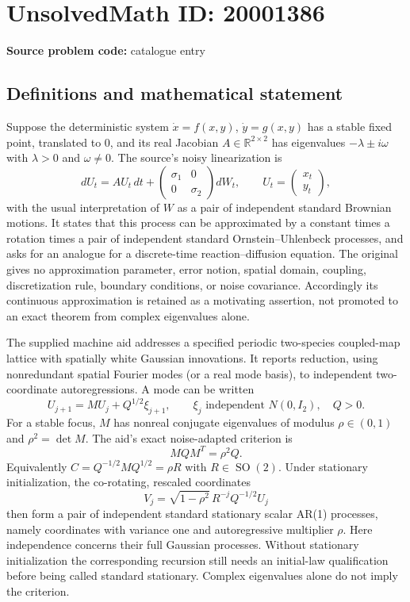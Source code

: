 \documentclass[11pt]{article}
\newcommand{\R}{\mathbb{R}}
\begin{document}
\section*{UnsolvedMath ID: 20001386}
\textbf{Source problem code:} catalogue entry
\subsection{Definitions and mathematical statement}
Suppose the deterministic system $\dot x=f(x,y)$, $\dot y=g(x,y)$ has a stable fixed point, translated to $0$, and its real Jacobian $A\in\R^{2\times2}$ has eigenvalues $-\lambda\pm i\omega$ with $\lambda>0$ and $\omega\ne0$. The source's noisy linearization is
\[
 dU_t=AU_t\,dt+\begin{pmatrix}\sigma_1&0\\0&\sigma_2\end{pmatrix}dW_t,
 \qquad U_t=\begin{pmatrix}x_t\\y_t\end{pmatrix},
\]
with the usual interpretation of $W$ as a pair of independent standard Brownian motions. It states that this process can be approximated by a constant times a rotation times a pair of independent standard Ornstein--Uhlenbeck processes, and asks for an analogue for a discrete-time reaction--diffusion equation. The original gives no approximation parameter, error notion, spatial domain, coupling, discretization rule, boundary conditions, or noise covariance. Accordingly its continuous approximation is retained as a motivating assertion, not promoted to an exact theorem from complex eigenvalues alone.

The supplied machine aid addresses a specified periodic two-species coupled-map lattice with spatially white Gaussian innovations. It reports reduction, using nonredundant spatial Fourier modes (or a real mode basis), to independent two-coordinate autoregressions. A mode can be written
\[
 U_{j+1}=MU_j+Q^{1/2}\xi_{j+1},\qquad
 \xi_j\text{ independent }N(0,I_2),\quad Q>0.
\]
For a stable focus, $M$ has nonreal conjugate eigenvalues of modulus $\rho\in(0,1)$ and $\rho^2=\det M$. The aid's exact noise-adapted criterion is
\[
 MQM^T=\rho^2Q.
\]
Equivalently $C=Q^{-1/2}MQ^{1/2}=\rho R$ with $R\in\operatorname{SO}(2)$. Under stationary initialization, the co-rotating, rescaled coordinates
\[
 V_j=\sqrt{1-\rho^2}\,R^{-j}Q^{-1/2}U_j
\]
then form a pair of independent standard stationary scalar AR(1) processes, namely coordinates with variance one and autoregressive multiplier $\rho$. Here independence concerns their full Gaussian processes. Without stationary initialization the corresponding recursion still needs an initial-law qualification before being called standard stationary. Complex eigenvalues alone do not imply the criterion.
\end{document}

